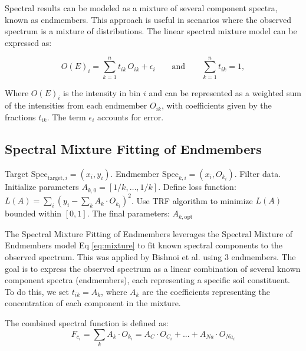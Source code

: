 \documentclass[preprint, 12pt, authoryear]{elsarticle}
\begin{document}
Spectral results can be modeled as a mixture of several component spectra, known as endmembers. This approach is useful in scenarios where the observed spectrum is a mixture of distributions. The linear spectral mixture model \cite{adams_classification_1995} can be expressed as:

\begin{equation}
    O(E)_i = \sum_{k=1}^{n} t_{ik} \, O_{ik} + \epsilon_i
    \qquad \text{and} \qquad
    \sum_{k=1}^{n} t_{ik} = 1,
    \label{eq:mixture}
\end{equation}

Where $O(E)_i$ is the intensity in bin $i$ and can be represented as a weighted sum of the intensities from each endmember $O_{ik}$, with coefficients given by the fractions $t_{ik}$. The term $\epsilon_i$ accounts for error.

\subsection{Spectral Mixture Fitting of Endmembers }

\begin{algorithm*}
\caption{Endmember Fitting Procedure}
\begin{algorithmic}[3]
    \Require Target $\text{Spec}_{\text{target},i} = (x_i, y_i)$.
    \Require Endmember $\text{Spec}_{k,i} = (x_i, O_{k_i})$.
    \State Filter data.
    \State Initialize parameters $A_{k, 0} = [1/k, \ldots, 1/k]$.
    \State Define loss function: $L(A) = \sum_i (y_i - \sum_k A_k \cdot O_{k_i})^2$.
    \State Use TRF algorithm to minimize $L(A)$ bounded within $[0, 1]$.
    \State \Return The final parameters: $A_{k, \text{opt}}$
\end{algorithmic}
\end{algorithm*}

The Spectral Mixture Fitting of Endmembers 
leverages the Spectral Mixture of Endmembers model Eq \ref{eq:mixture} to fit known spectral components to the observed spectrum. This was applied by Bishnoi et al. \cite{bishnoi_modeling_2019} using 3 endmembers. The goal is to express the observed spectrum as a linear combination of several known component spectra (endmembers), each representing a specific soil constituent. To do this, we set $t_{ik} = A_k$, where $A_k$ are the coefficients representing the concentration of each component in the mixture.

The combined spectral function is defined as:
\begin{equation}
F_{c_i} = \sum_{k} A_k \cdot O_{k_i} = A_{C} \cdot O_{C_i} + ... + A_{Na} \cdot O_{Na_i}
\label{eq:combined_spectrum}
\end{equation}
\end{document}
